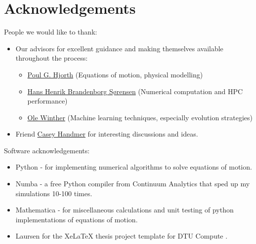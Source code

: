 \chapter{Acknowledgements}
People we would like to thank:
\begin{itemize}
    \item Our advisors for excellent guidance and making themselves available throughout the process:
    \begin{itemize}
        \item \href{http://www.dtu.dk/english/service/phonebook/person?id=901&tab=1}{Poul G. Hjorth} (Equations of motion, physical modelling)
        \item \href{http://www.dtu.dk/english/service/phonebook/person?id=30220&tab=1}{Hans Henrik Brandenborg Sørensen} (Numerical computation and HPC performance)
        \item \href{http://www.dtu.dk/english/service/phonebook/person?id=10167&tab=1}{Ole Winther} (Machine learning techniques, especially evolution strategies)
    \end{itemize}
    \item Friend \href{https://www.linkedin.com/in/casey-handmer-60183262/}{Casey Handmer} for interesting discussions and ideas.
\end{itemize}
\vspace{1cm}
Software acknowledgements:
\begin{itemize}
    \item Python - for implementing numerical algorithms to solve equations of motion. 
    \item Numba - a free Python compiler from Continuum Analytics that sped up my simulations 10-100 times.
    \item Mathematica - for miscellaneous calculations and unit testing of python implementations of equations of motion.
    \item Laursen for the XeLaTeX thesis project template for DTU Compute \cite{laursens}.
\end{itemize}